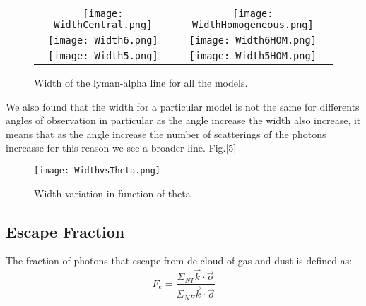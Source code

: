 \documentclass{article}
\theoremstyle{definition}
\theoremstyle{remark}
\begin{document}
\begin{figure}[H]

  \centering

  \label{figur}\caption{Width of the lyman-alpha line for all the models. }

  \begin{tabular}{cc}

    
    \texttt{[image: WidthCentral.png]}&

    \texttt{[image: WidthHomogeneous.png]}\\

    \texttt{[image: Width6.png]}&

    \texttt{[image: Width6HOM.png]}\\

    \texttt{[image: Width5.png]}&

    \texttt{[image: Width5HOM.png]}\\

  \end{tabular}

\end{figure}

We also found that the width for a particular model is not the same for differents angles of observation in particular as the angle increase the width also increase, it means that as the angle increase the number of scatterings of the photons increasse for this reason we see a broader line. Fig.[5]\\

\begin{figure}[H]
\begin{center}
\texttt{[image: WidthvsTheta.png]}
\caption{Width variation in function of theta}
\end{center}
\end{figure}




\subsection*{Escape Fraction}

The fraction of photons that escape from de cloud of gas and dust is defined as:\\

\begin{equation}
F_{e}=\dfrac{\Sigma_{NI} \vec{k}\cdot \vec{o}}{\Sigma_{NF}\vec{k}\cdot \vec{o}}
\end{equation}
\end{document}
